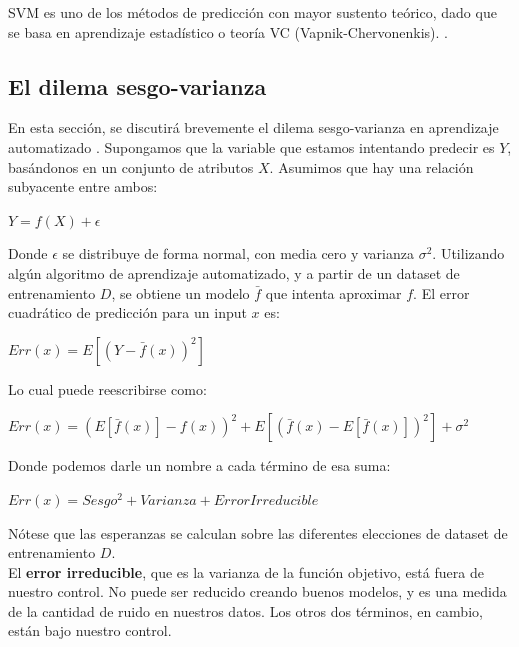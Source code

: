 SVM es uno de los métodos de predicción con mayor sustento teórico, dado que se basa en aprendizaje estadístico o teoría VC (Vapnik-Chervonenkis). \cite{vapnik71uniform} \cite{vapnik74theory}.

\subsection{El dilema sesgo-varianza}

En esta sección, se discutirá brevemente el dilema sesgo-varianza en aprendizaje automatizado \cite{statisticallearning}. Supongamos que la variable que estamos intentando predecir es $Y$, basándonos en un conjunto de atributos $X$. Asumimos que hay una relación subyacente entre ambos:
\begin{center}
$Y = f(X) + \epsilon$
\end{center}

Donde $\epsilon$ se distribuye de forma normal, con media cero y varianza $\sigma^2$. Utilizando algún algoritmo de aprendizaje automatizado, y a partir de un dataset de entrenamiento $D$, se obtiene un modelo $\bar{f}$ que intenta aproximar $f$. El error cuadrático de predicción para un input $x$ es:\\

\begin{center}
$Err(x) = E[(Y-\bar{f}(x))^2]$
\end{center}

Lo cual puede reescribirse como:

\begin{center}
$Err(x) = (E[\bar{f}(x)]-f(x))^2 + E[(\bar{f}(x)-E[\bar{f}(x)])^2] + \sigma^2$ 
\end{center}

Donde podemos darle un nombre a cada término de esa suma:

\begin{center}
$Err(x) =  Sesgo^2 + Varianza + Error Irreducible$
\end{center}

Nótese que las esperanzas se calculan sobre las diferentes elecciones de dataset de entrenamiento $D$. \\

El \textbf{error irreducible}, que es la varianza de la función objetivo, está fuera de nuestro control. No puede ser reducido creando buenos modelos, y es una medida de la cantidad de ruido en nuestros datos. Los otros dos términos, en cambio, están bajo nuestro control.\\

